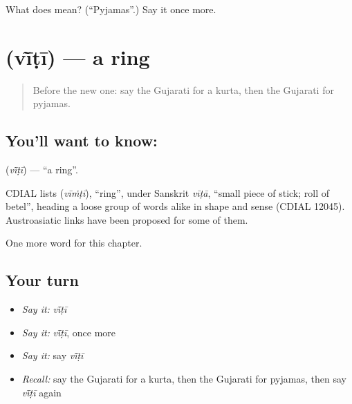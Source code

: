 \begin{tcolorbox}[breakable,colback=teal!4,colframe=teal!35!black,title={Before you move on}]
What does  mean? (\textquotedblleft{}Pyjamas\textquotedblright{}.) Say it once more.
\end{tcolorbox}
\section[\texorpdfstring{\gu{વીંટી} (vī̃ṭī)}{વીંટી (vī̃ṭī)}]{ (vī̃ṭī) — a ring}

\label{lesson:GU-C111-viti}



\begin{quote}
Before the new one: say the Gujarati for a kurta, then the Gujarati for pyjamas.
\end{quote}

\subsection*{You'll want to know: }
\textbf{} (\emph{vī̃ṭī}) — \textquotedblleft{}a ring\textquotedblright{}.

\begin{cousinweb}
CDIAL lists \textbf{} (\emph{vīṁṭī}), \textquotedblleft{}ring\textquotedblright{}, under Sanskrit \emph{vīṭā}, \textquotedblleft{}small piece of stick; roll of betel\textquotedblright{}, heading a loose group of words alike in shape and sense (CDIAL 12045). Austroasiatic links have been proposed for some of them.
\end{cousinweb}

\begin{grammarlens}[title={What you've built}]
One more word for this chapter.
\end{grammarlens}

\subsection*{Your turn}
\begin{itemize}
\raggedright
  \item \emph{Say it:} \emph{vī̃ṭī}
  \item \emph{Say it:} \emph{vī̃ṭī}, once more
  \item \emph{Say it:} say \emph{vī̃ṭī}
  \item \emph{Recall:} say the Gujarati for a kurta, then the Gujarati for pyjamas, then say \emph{vī̃ṭī} again
\end{itemize}


